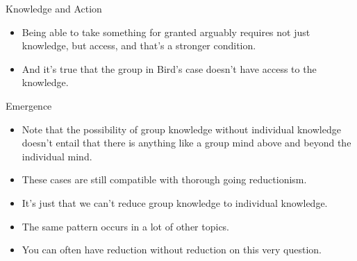 \documentclass[
  ignorenonframetext,
]{beamer}
\providecommand{\tightlist}{%
  \setlength{\itemsep}{0pt}\setlength{\parskip}{0pt}}
\begin{document}
\begin{frame}{Knowledge and Action}
\protect\hypertarget{knowledge-and-action-2}{}
\begin{itemize}
\tightlist
\item
  Being able to take something for granted arguably requires not just
  knowledge, but access, and that's a stronger condition.
\item
  And it's true that the group in Bird's case doesn't have access to the
  knowledge.
\end{itemize}
\end{frame}

\begin{frame}{Emergence}
\protect\hypertarget{emergence}{}
\begin{itemize}
\tightlist
\item
  Note that the possibility of group knowledge without individual
  knowledge doesn't entail that there is anything like a group mind
  above and beyond the individual mind.
\item
  These cases are still compatible with thorough going reductionism.
\item
  It's just that we can't reduce group knowledge to individual
  knowledge. \pause
\item
  The same pattern occurs in a lot of other topics.
\item
  You can often have reduction without reduction on this very question.
\end{itemize}
\end{frame}
\end{document}
